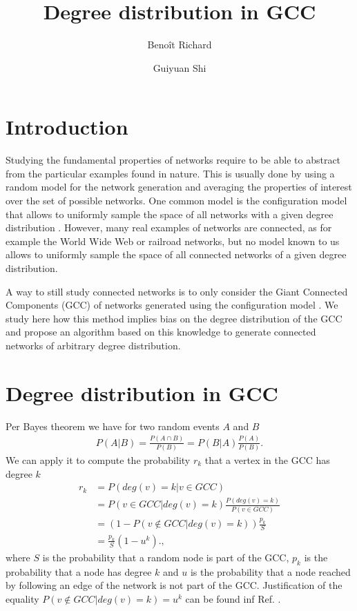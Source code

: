 \documentclass[a4paper]{article}
\title{Degree distribution in GCC}
\author{Benoît Richard \and Guiyuan Shi}
\begin{document}
\listoftodos

\maketitle


\section{Introduction}

Studying the fundamental properties of networks require to be able to abstract from the particular examples found in nature. This is usually done \missingref by using a random model for the network generation and averaging the properties of interest over the set of possible networks. One common model is the configuration model \missingref that allows to uniformly sample the space of all networks with a given degree distribution \missingref. However, many real examples of networks are connected, as for example the World Wide Web or railroad networks, but no model known to us allows to uniformly sample the space of all connected networks of a given degree distribution.

A way to still study connected networks is to only consider the Giant Connected Components (GCC) of networks generated using the configuration model \missingref. We study here how this method implies bias on the degree distribution of the GCC and propose an algorithm based on this knowledge to generate connected networks of arbitrary degree distribution.

\section{Degree distribution in GCC}

Per Bayes theorem we have for two random events $A$ and $B$
\begin{align}
	P(A | B) = \frac{P(A \cap B)}{ P(B)} = P(B | A) \frac{P(A)}{P(B)}. \label{Bayes theorem}
\end{align}
We can apply it to compute the probability $r_k$ that a vertex in the GCC has degree $k$
\begin{align}
	r_k &= P\left(deg(v) = k | v \in GCC\right)\\
	&= P(v \in GCC | deg(v) = k) \frac{P(deg(v) = k)}{P(v \in GCC)} \\
	&= (1 - P(v \notin GCC|deg(v) = k)) \frac{p_k}{S} \\
	&= \frac{p_k}{S} (1 - u^k). \label{Degree distribution in GCC},
\end{align}
where $S$ is the probability that a random node is part of the GCC, $p_k$ is the probability that a node has degree $k$ and $u$ is the probability that a node reached by following an edge of the network is not part of the GCC. Justification of the equality $P(v \notin GCC|deg(v) = k) = u^k$ can be found inf Ref. \citep{newman2010networks}.
\end{document}
